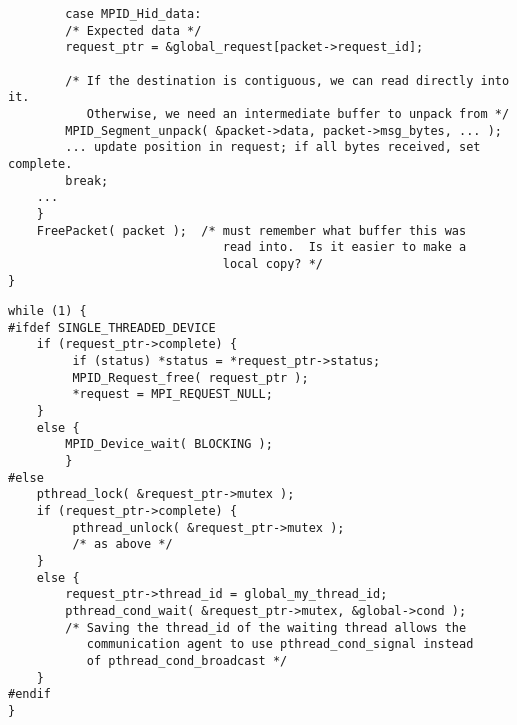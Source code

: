 \begin{verbatim}
        case MPID_Hid_data:
        /* Expected data */
        request_ptr = &global_request[packet->request_id];

        /* If the destination is contiguous, we can read directly into it.
           Otherwise, we need an intermediate buffer to unpack from */
        MPID_Segment_unpack( &packet->data, packet->msg_bytes, ... );
        ... update position in request; if all bytes received, set complete.
        break;
    ...
    }
    FreePacket( packet );  /* must remember what buffer this was
                              read into.  Is it easier to make a 
                              local copy? */
}
\end{verbatim}

\begin{verbatim}
while (1) {
#ifdef SINGLE_THREADED_DEVICE
    if (request_ptr->complete) {
         if (status) *status = *request_ptr->status;
         MPID_Request_free( request_ptr );
         *request = MPI_REQUEST_NULL;
    }
    else {
        MPID_Device_wait( BLOCKING );
        }
#else
    pthread_lock( &request_ptr->mutex );
    if (request_ptr->complete) {
         pthread_unlock( &request_ptr->mutex );
         /* as above */
    }
    else {
        request_ptr->thread_id = global_my_thread_id;
        pthread_cond_wait( &request_ptr->mutex, &global->cond );
        /* Saving the thread_id of the waiting thread allows the 
           communication agent to use pthread_cond_signal instead
           of pthread_cond_broadcast */
    }
#endif
} 
\end{verbatim}

\paragraph{\shmemname}

\paragraph{\vianame}
